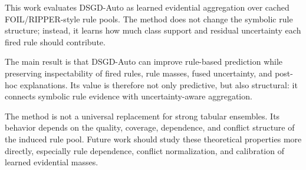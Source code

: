 \documentclass[conference]{IEEEtran}
\begin{document}
This work evaluates DSGD-Auto as learned evidential aggregation over cached FOIL/RIPPER-style rule pools. The method does not change the symbolic rule structure; instead, it learns how much class support and residual uncertainty each fired rule should contribute.

The main result is that DSGD-Auto can improve rule-based prediction while preserving inspectability of fired rules, rule masses, fused uncertainty, and post-hoc explanations. Its value is therefore not only predictive, but also structural: it connects symbolic rule evidence with uncertainty-aware aggregation.

The method is not a universal replacement for strong tabular ensembles. Its behavior depends on the quality, coverage, dependence, and conflict structure of the induced rule pool. Future work should study these theoretical properties more directly, especially rule dependence, conflict normalization, and calibration of learned evidential masses.
\end{document}
